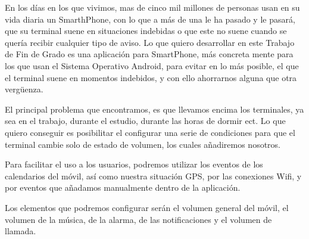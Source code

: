

En los días en los que vivimos, mas de cinco mil millones de personas usan en su vida diaria un SmarthPhone, con lo que a más de una le ha pasado y le pasará, que su terminal suene en situaciones indebidas o que este no suene cuando se quería recibir cualquier tipo de aviso. Lo que quiero desarrollar en este Trabajo de Fin de Grado es una aplicación para SmartPhone, más concreta mente para los que usan el Sistema Operativo Android, para evitar en lo más posible, el que el terminal suene en momentos indebidos, y con ello ahorrarnos alguna que otra vergüenza.


El principal problema que encontramos, es que llevamos encima los terminales, ya sea en el trabajo, durante el estudio, durante las horas de dormir ect. Lo que quiero conseguir es posibilitar el configurar una serie de condiciones para que el terminal cambie solo de estado de volumen, los cuales añadiremos nosotros.


Para facilitar el uso a los usuarios, podremos utilizar los eventos de los calendarios del móvil, así como nuestra situación GPS, por las conexiones Wifi, y por eventos que añadamos manualmente dentro de la aplicación.


Los elementos que podremos configurar serán el volumen general del móvil, el volumen de la música, de la alarma, de las notificaciones y el volumen de llamada.
